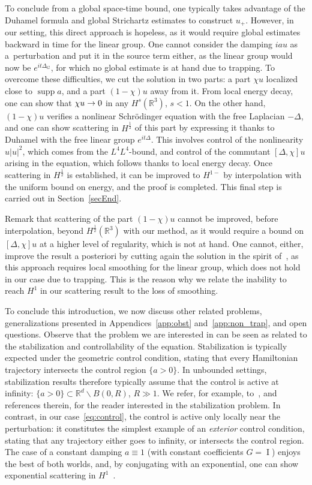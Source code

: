 \documentclass[AHL,Unicode,longabstracts,published]{cedram}
\newcommand*\R{\mathbb{R}}
\DeclareMathOperator{\I}{I}
\DeclareMathOperator{\supp}{supp}
\newcounter{setofstep}
\newcounter{step}[setofstep]
\renewcommand*{\to}{\mathchoice{\longrightarrow}{\rightarrow}{\rightarrow}{\rightarrow}}
\begin{document}
To conclude from a global space-time bound, one typically takes advantage of the Duhamel formula and global Strichartz estimates to construct $u_+$. However, in our setting, this direct approach is hopeless, as it would require global estimates backward in time for the linear group. One cannot consider the damping $iau$ as a~perturbation and put it in the source term either, as the linear group would now be $e^{it\Delta_G}$, for which no global estimate is at hand due to trapping. To overcome these difficulties, we cut the solution in two parts: a part $\chi u$ localized close to $\supp a$, and a part $(1-\chi) u$ away from it. From local energy decay, one can show that $\chi u \to 0$ in any $H^s(\R^3)$, $s<1$. On the other hand, $(1-\chi) u$ verifies a nonlinear Schr{\"o}dinger equation with the free Laplacian $-\Delta$, and one can show scattering in $H^{\frac 12}$ of this part by expressing it thanks to Duhamel with the free linear group $e^{it\Delta}$. This involves control of the nonlinearity $u|u|^2$, which comes from the $L^4 L^4$-bound, and control of the commutant $[\Delta, \chi]u$ arising in the equation, which follows thanks to local energy decay. Once scattering in $H^{\frac 12}$ is established, it can be improved to $H^{1-}$ by interpolation with the uniform bound on energy, and the proof is completed. This final step is carried out in Section~\ref{secEnd}.

Remark that scattering of the part $(1-\chi)u$ cannot be improved, before interpolation, beyond $H^{\frac 12}(\R^3)$ with our method, as it would require a bound on $[\Delta, \chi]u$ at a higher level of regularity, which is not at hand. One cannot, either, improve the result a posteriori by cutting again the solution in the spirit of~\cite{PV1}, as this approach requires local smoothing for the linear group, which does not hold in our case due to trapping. This is the reason why we relate the inability to reach $H^1$ in our scattering result to the loss of smoothing.

To conclude this introduction, we now discuss other related problems, generalizations presented in Appendices~\ref{app:obst} and~\ref{app:non_trap}, and open questions. Observe that the problem we are interested in can be seen as related to the stabilization and controllability of the equation. Stabilization is typically expected under the geometric control condition, stating that every Hamiltonian trajectory intersects the control region $\{ a > 0 \}$. In unbounded settings, stabilization results therefore typically assume that the control is active at infinity: $\{ a > 0 \}\subset \R^d \backslash B(0, R)$, $R\gg1$. We refer, for example, to~\cite{stab24, CaCoWe20,DeGeLe06, Lau10,BaMa23, RoZh10,YaNiChe21}, and references therein, for the reader interested in the stabilization problem. In contrast, in our case~\eqref{eq:control}, the control is active only locally near the perturbation: it constitutes the simplest example of an \emph{exterior} control condition, stating that any trajectory either goes to infinity, or intersects the control region. The case of a constant damping $a\equiv1$ (with constant coefficients $G=\I$) enjoys the best of both worlds, and, by conjugating with an exponential, one can show exponential scattering in $H^1$~\cite{Ta19}.
\end{document}
